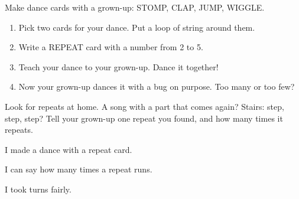
\begin{playathome}
Make dance cards with a grown-up: STOMP, CLAP, JUMP, WIGGLE.
\begin{enumerate}[leftmargin=1.4em,itemsep=2pt]
  \item Pick two cards for your dance. Put a loop of string around them.
  \item Write a REPEAT card with a number from 2 to 5.
  \item Teach your dance to your grown-up. Dance it together!
  \item Now your grown-up dances it with a bug on purpose. Too many or too few?
\end{enumerate}
\end{playathome}

\begin{playathome}
Look for repeats at home. A song with a part that comes again? Stairs: step, step, step? Tell your grown-up one repeat you found, and how many times it repeats.
\end{playathome}

\begin{selfcheck}
  \item I made a dance with a repeat card.
  \item I can say how many times a repeat runs.
  \item I took turns fairly.
\end{selfcheck}

